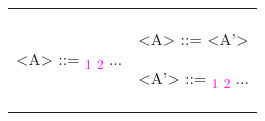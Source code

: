 \begin{tabular}{p{5cm} p{5cm}}
	
	\begin{grammarEx}
		<A> ::= \textcolor{OliveGreen}{\textalpha{}} \textcolor{Fuchsia}{\textbeta{} \textsubscript{1}}
		\alt \textcolor{OliveGreen}{\textalpha{}} \textcolor{Fuchsia}{\textbeta \textsubscript{2}}
		\alt ...
	\end{grammarEx}
	
	&
	
	\begin{grammarEx}
		<A> ::= \textcolor{OliveGreen}{\textalpha{}} <A'>
		
		<A'> ::= \textcolor{Fuchsia}{\textbeta \textsubscript{1}}
		\alt \textcolor{Fuchsia}{\textbeta \textsubscript{2}}
		\alt ...
	\end{grammarEx}
	
\end{tabular}